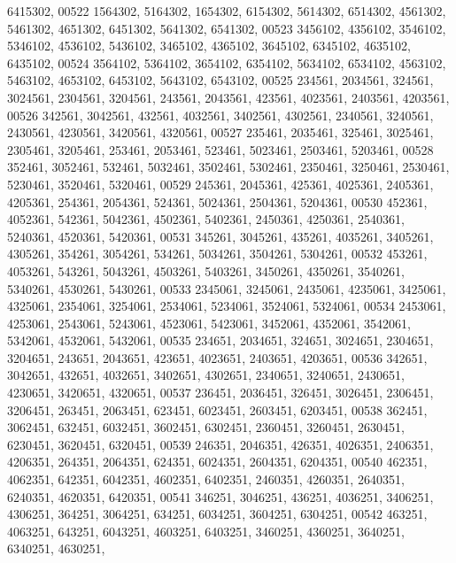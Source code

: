 \begin{DoxyCode}
      6415302,
00522       1564302, 5164302, 1654302, 6154302, 5614302, 6514302, 4561302, 5461302, 4651302, 6451302, 5641302, 
      6541302,
00523       3456102, 4356102, 3546102, 5346102, 4536102, 5436102, 3465102, 4365102, 3645102, 6345102, 4635102, 
      6435102,
00524       3564102, 5364102, 3654102, 6354102, 5634102, 6534102, 4563102, 5463102, 4653102, 6453102, 5643102, 
      6543102,
00525        234561, 2034561,  324561, 3024561, 2304561, 3204561,  243561, 2043561,  423561, 4023561, 2403561, 
      4203561,
00526        342561, 3042561,  432561, 4032561, 3402561, 4302561, 2340561, 3240561, 2430561, 4230561, 3420561, 
      4320561,
00527        235461, 2035461,  325461, 3025461, 2305461, 3205461,  253461, 2053461,  523461, 5023461, 2503461, 
      5203461,
00528        352461, 3052461,  532461, 5032461, 3502461, 5302461, 2350461, 3250461, 2530461, 5230461, 3520461, 
      5320461,
00529        245361, 2045361,  425361, 4025361, 2405361, 4205361,  254361, 2054361,  524361, 5024361, 2504361, 
      5204361,
00530        452361, 4052361,  542361, 5042361, 4502361, 5402361, 2450361, 4250361, 2540361, 5240361, 4520361, 
      5420361,
00531        345261, 3045261,  435261, 4035261, 3405261, 4305261,  354261, 3054261,  534261, 5034261, 3504261, 
      5304261,
00532        453261, 4053261,  543261, 5043261, 4503261, 5403261, 3450261, 4350261, 3540261, 5340261, 4530261, 
      5430261,
00533       2345061, 3245061, 2435061, 4235061, 3425061, 4325061, 2354061, 3254061, 2534061, 5234061, 3524061, 
      5324061,
00534       2453061, 4253061, 2543061, 5243061, 4523061, 5423061, 3452061, 4352061, 3542061, 5342061, 4532061, 
      5432061,
00535        234651, 2034651,  324651, 3024651, 2304651, 3204651,  243651, 2043651,  423651, 4023651, 2403651, 
      4203651,
00536        342651, 3042651,  432651, 4032651, 3402651, 4302651, 2340651, 3240651, 2430651, 4230651, 3420651, 
      4320651,
00537        236451, 2036451,  326451, 3026451, 2306451, 3206451,  263451, 2063451,  623451, 6023451, 2603451, 
      6203451,
00538        362451, 3062451,  632451, 6032451, 3602451, 6302451, 2360451, 3260451, 2630451, 6230451, 3620451, 
      6320451,
00539        246351, 2046351,  426351, 4026351, 2406351, 4206351,  264351, 2064351,  624351, 6024351, 2604351, 
      6204351,
00540        462351, 4062351,  642351, 6042351, 4602351, 6402351, 2460351, 4260351, 2640351, 6240351, 4620351, 
      6420351,
00541        346251, 3046251,  436251, 4036251, 3406251, 4306251,  364251, 3064251,  634251, 6034251, 3604251, 
      6304251,
00542        463251, 4063251,  643251, 6043251, 4603251, 6403251, 3460251, 4360251, 3640251, 6340251, 4630251, 

\end{DoxyCode}
